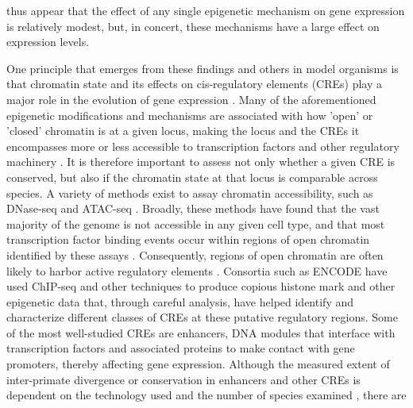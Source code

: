 {thus appear that the effect of any single epigenetic mechanism on gene expression is relatively modest, but, in concert, these mechanisms have a large effect on expression levels.

One principle that emerges from these findings and others in model organisms is that chromatin state and its effects on cis-regulatory elements (CREs) play a major role in the evolution of gene expression \cite{Romero, Ruvinsky and Gilad 2012, Degner et al 2012 (DNase I sensitivity QTLs are...)}. Many of the aforementioned epigenetic modifications and mechanisms are associated with how 'open' or 'closed' chromatin is at a given locus, making the locus and the CREs it encompasses more or less accessible to transcription factors and other regulatory machinery \cite{Calo and Wysocka 2013 (Modification of enhancer chromatin: what, how and why?)}. It is therefore important to assess not only whether a given CRE is conserved, but also if the chromatin state at that locus is comparable across species. A variety of methods exist to assay chromatin accessibility, such as DNase-seq and ATAC-seq \cite{Klein and Hainer 2019 (Genomic methods in profiling DNA accessibility and factor localization), Tsompana and Buck 2014 (Chromatin accessibility: a window into the genome), Buenrostro et al 2015 (ATAC-seq: A method for assaying chromatin accessibility genome-wide)}. Broadly, these methods have found that the vast majority of the genome is not accessible in any given cell type, and that most transcription factor binding events occur within regions of open chromatin identified by these assays \cite{Thurman et al. 2012 (The accessible chromatin landscape of the human genome)}. Consequently, regions of open chromatin are often likely to harbor active regulatory elements \cite{Song et al. 2011 (Open chromatin defined by DNaseI and FAIRE identified regulatory elements that shape cell-type identity), Klemm et al. 2019 (Chromatin accessibility and the regulatory epigenome)}. Consortia such as ENCODE have used ChIP-seq and other techniques to produce copious histone mark and other epigenetic data that, through careful analysis, have helped identify and characterize different classes of CREs at these putative regulatory regions\cite{ENCODE Project Consortium 2012 (An integrated...in the human genome), Li et al. 2018 (Genome-wide prediction of cis-regulatory regions using supervised deep learning methods), Ernst and Kellis 2012 (ChromHMM: automating chromatin-state discovery and characterization), Hoffman et al. 2012 (Unsupervised pattern discovery in human chromatin structure through genomic segmentation)}. Some of the most well-studied CREs are enhancers, DNA modules that interface with transcription factors and associated proteins to make contact with gene promoters, thereby affecting gene expression. Although the measured extent of inter-primate divergence or conservation in enhancers and other CREs is dependent on the technology used and the number of species examined \cite{Edsall et al. 2019 (Evaluating chromatin accessibility differences across multiple primate species using a joint modeling approach), Swain-Lenz et al 2019 (Comparative analyses of chromatin landscape in white adipose tissue suggest humans may have less beigeing...)}, there are }
